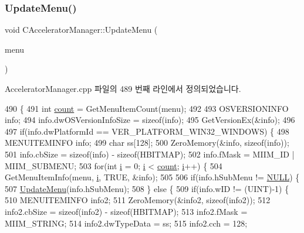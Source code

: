 \subsubsection{\texorpdfstring{Update\+Menu()}{UpdateMenu()}\hspace{0.1cm}{\footnotesize\ttfamily [1/2]}}
{\footnotesize\ttfamily void C\+Accelerator\+Manager\+::\+Update\+Menu (\begin{DoxyParamCaption}\item[{H\+M\+E\+NU}]{menu }\end{DoxyParamCaption})}



Accelerator\+Manager.\+cpp 파일의 489 번째 라인에서 정의되었습니다.


\begin{DoxyCode}
490 \{
491   \textcolor{keywordtype}{int} \mbox{\hyperlink{expr_8cpp_a16ff2d8e15ade4948398b0aeb80124a8}{count}} = GetMenuItemCount(menu);
492 
493   OSVERSIONINFO info;
494   info.dwOSVersionInfoSize = \textcolor{keyword}{sizeof}(info);
495   GetVersionEx(&info);
496   
497   \textcolor{keywordflow}{if}(info.dwPlatformId == VER\_PLATFORM\_WIN32\_WINDOWS) \{
498     MENUITEMINFO info;
499     \textcolor{keywordtype}{char} ss[128];
500     ZeroMemory(&info, \textcolor{keyword}{sizeof}(info));
501     info.cbSize = \textcolor{keyword}{sizeof}(info) - \textcolor{keyword}{sizeof}(HBITMAP);
502     info.fMask = MIIM\_ID | MIIM\_SUBMENU;
503     \textcolor{keywordflow}{for}(\textcolor{keywordtype}{int} \mbox{\hyperlink{expr-lex_8cpp_acb559820d9ca11295b4500f179ef6392}{i}} = 0; \mbox{\hyperlink{expr-lex_8cpp_acb559820d9ca11295b4500f179ef6392}{i}} < \mbox{\hyperlink{expr_8cpp_a16ff2d8e15ade4948398b0aeb80124a8}{count}}; \mbox{\hyperlink{expr-lex_8cpp_acb559820d9ca11295b4500f179ef6392}{i}}++) \{
504       GetMenuItemInfo(menu, \mbox{\hyperlink{expr-lex_8cpp_acb559820d9ca11295b4500f179ef6392}{i}}, TRUE, &info);
505       
506       \textcolor{keywordflow}{if}(info.hSubMenu != \mbox{\hyperlink{getopt1_8c_a070d2ce7b6bb7e5c05602aa8c308d0c4}{NULL}}) \{
507         \mbox{\hyperlink{class_c_accelerator_manager_ac854ec5263a7bab961bf63aec3938984}{UpdateMenu}}(info.hSubMenu);
508       \} \textcolor{keywordflow}{else} \{
509         \textcolor{keywordflow}{if}(info.wID != (UINT)-1) \{
510           MENUITEMINFO info2;
511           ZeroMemory(&info2, \textcolor{keyword}{sizeof}(info2));
512           info2.cbSize = \textcolor{keyword}{sizeof}(info2) - \textcolor{keyword}{sizeof}(HBITMAP);
513           info2.fMask = MIIM\_STRING;
514           info2.dwTypeData = ss;
515           info2.cch = 128;

\end{DoxyCode}
